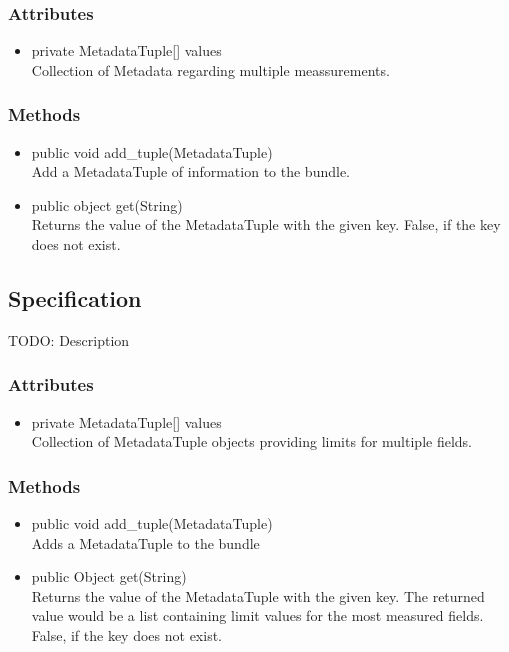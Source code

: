 \subsubsection{Attributes}
\begin{itemize}
	\item private MetadataTuple[] values\\
	Collection of Metadata regarding multiple meassurements.
\end{itemize}
\subsubsection{Methods}
\begin{itemize}
	\item public void add\_tuple(MetadataTuple)\\
	Add a MetadataTuple of information to the bundle.
	\item public object get(String)\\
	Returns the value of the MetadataTuple with the given key. False, if the key does not exist.
\end{itemize}


\subsection{Specification}
TODO: Description

\subsubsection{Attributes}
\begin{itemize}
	\item private MetadataTuple[] values\\
	Collection of MetadataTuple objects providing limits for multiple fields.
\end{itemize}
\subsubsection{Methods}
\begin{itemize}
	\item public void add\_tuple(MetadataTuple)\\
	Adds a MetadataTuple to the bundle
	\item public Object get(String)\\
	Returns the value of the MetadataTuple with the given key. The returned value would be a list containing limit values for the most measured fields. False, if the key does not exist.
\end{itemize}


